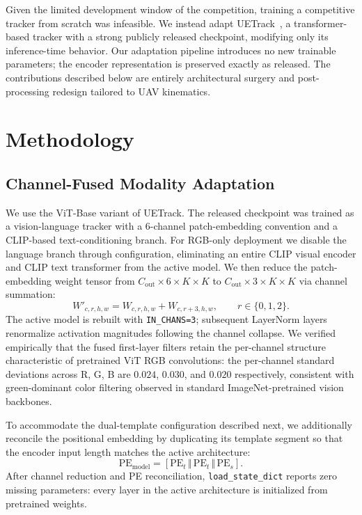 \documentclass[10pt,twocolumn,letterpaper]{article}
\begin{document}
Given the limited development window of the competition, training a competitive tracker from scratch was infeasible. We instead adapt UETrack~\cite{uetrack2026}, a transformer-based tracker with a strong publicly released checkpoint, modifying only its inference-time behavior. Our adaptation pipeline introduces no new trainable parameters; the encoder representation is preserved exactly as released. The contributions described below are entirely architectural surgery and post-processing redesign tailored to UAV kinematics.

\section{Methodology}

\subsection{Channel-Fused Modality Adaptation}

We use the ViT-Base variant of UETrack. The released checkpoint was trained as a vision-language tracker with a 6-channel patch-embedding convention and a CLIP-based text-conditioning branch. For RGB-only deployment we disable the language branch through configuration, eliminating an entire CLIP visual encoder and CLIP text transformer from the active model. We then reduce the patch-embedding weight tensor from $C_{\text{out}} \times 6 \times K \times K$ to $C_{\text{out}} \times 3 \times K \times K$ via channel summation:
\begin{equation}
W'_{c, r, h, w} = W_{c, r, h, w} + W_{c, r+3, h, w}, \qquad r \in \{0, 1, 2\}.
\end{equation}
The active model is rebuilt with \texttt{IN\_CHANS=3}; subsequent LayerNorm layers renormalize activation magnitudes following the channel collapse. We verified empirically that the fused first-layer filters retain the per-channel structure characteristic of pretrained ViT RGB convolutions: the per-channel standard deviations across R, G, B are $0.024$, $0.030$, and $0.020$ respectively, consistent with green-dominant color filtering observed in standard ImageNet-pretrained vision backbones.

To accommodate the dual-template configuration described next, we additionally reconcile the positional embedding by duplicating its template segment so that the encoder input length matches the active architecture:
\begin{equation}
\text{PE}_{\text{model}} = [\text{PE}_t \,\Vert\, \text{PE}_t \,\Vert\, \text{PE}_s].
\end{equation}
After channel reduction and PE reconciliation, \texttt{load\_state\_dict} reports zero missing parameters: every layer in the active architecture is initialized from pretrained weights.
\end{document}
